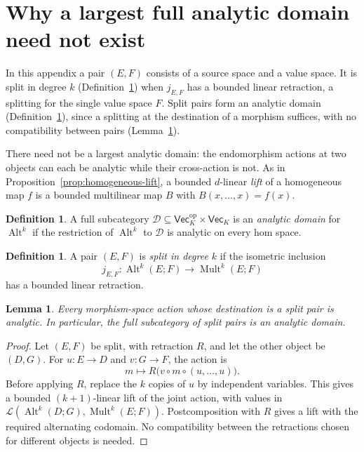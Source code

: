 \documentclass[11pt]{amsart}
\newtheorem{lemma}[theorem]{Lemma}
\theoremstyle{definition}
\newtheorem{definition}[theorem]{Definition}
\theoremstyle{remark}
\numberwithin{equation}{section}
\newcommand{\cL}{\mathcal L}
\newcommand{\Alt}{\operatorname{Alt}}
\newcommand{\Mult}{\operatorname{Mult}}
\theoremstyle{plain}
\theoremstyle{definition}
\theoremstyle{plain}
\begin{document}
\section{Why a largest full analytic domain need not exist}\label{app:no-largest}\label{dom:section}\label{sec:domains}
In this appendix a pair $(E,F)$ consists of a source space and a value space. It is split in degree $k$
(Definition~\ref{dom:split-pair}) when $j_{E,F}$ has a bounded linear retraction, a splitting for the single
value space $F$. Split pairs form an analytic domain (Definition~\ref{dom:definition}), since a splitting at
the destination of a morphism suffices, with no compatibility between pairs (Lemma~\ref{dom:split-incoming}).

There need not be a largest analytic domain: the endomorphism actions at two objects can each be
analytic while their cross-action is not.
As in Proposition~\ref{prop:homogeneous-lift}, a bounded $d$-linear \emph{lift} of a
homogeneous map $f$ is a bounded multilinear map $B$ with $B(x,\ldots,x)=f(x)$.

\begin{definition}\label{dom:definition}
A full subcategory $\mathcal D\subseteq\mathsf{Vec}_K^{\mathrm{op}}\times\mathsf{Vec}_K$ is an
\emph{analytic domain} for $\Alt^k$ if the restriction of $\Alt^k$ to $\mathcal D$ is analytic on every
hom space.
\end{definition}

\begin{definition}\label{dom:split-pair}
A pair $(E,F)$ is \emph{split in degree $k$} if the isometric inclusion
\[
j_{E,F}\colon\Alt^k(E;F)\longrightarrow\Mult^k(E;F)
\]
has a bounded linear retraction.
\end{definition}

\begin{lemma}\label{dom:split-incoming}
Every morphism-space action whose destination is a split pair is analytic. In particular, the full
subcategory of split pairs is an analytic domain.
\end{lemma}

\begin{proof}
Let $(E,F)$ be split, with retraction $R$, and let the other object be $(D,G)$. For $u\colon E\to D$
and $v\colon G\to F$, the action is
\[
m\longmapsto R\bigl(v\circ m\circ(u,\ldots,u)\bigr).
\]
Before applying $R$, replace the $k$ copies of $u$ by independent variables. This gives a bounded
$(k+1)$\nobreakdash-linear lift of the joint action, with values in
$\cL(\Alt^k(D;G),\Mult^k(E;F))$. Postcomposition with $R$ gives a lift with the required alternating
codomain. No compatibility between the retractions chosen for different objects is needed.
\end{proof}
\end{document}
